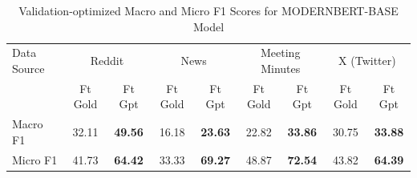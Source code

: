 \begin{table}[htbp]
\centering
\begin{tabular}{l *{8}{c}}
\toprule
Data Source & \multicolumn{2}{c}{Reddit} & \multicolumn{2}{c}{News} & \multicolumn{2}{c}{Meeting Minutes} & \multicolumn{2}{c}{X (Twitter)} \\
& Ft Gold & Ft Gpt & Ft Gold & Ft Gpt & Ft Gold & Ft Gpt & Ft Gold & Ft Gpt \\
\midrule
Macro F1 & 32.11 & \textbf{49.56} & 16.18 & \textbf{23.63} & 22.82 & \textbf{33.86} & 30.75 & \textbf{33.88} \\
Micro F1 & 41.73 & \textbf{64.42} & 33.33 & \textbf{69.27} & 48.87 & \textbf{72.54} & 43.82 & \textbf{64.39} \\
\bottomrule
\end{tabular}
\centering\caption{Validation-optimized Macro and Micro F1 Scores for MODERNBERT-BASE Model}
\label{tab:modernbert-base_macro_micro}
\end{table}